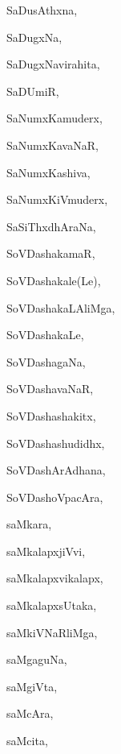 \begin{multicols}{3}
{\noindent
{SaDusAthxna}, \pageref{SaDusAthxna}

\noindent
{SaDugxNa}, \pageref{SaDugxNa}

\noindent
{SaDugxNavirahita}, \pageref{SaDugxNavirahita}

\noindent
{SaDUmiR}, \pageref{SaDUmiR}

\noindent
{SaNumxKamuderx}, \pageref{SaNumxKamuderx}

\noindent
{SaNumxKavaNaR}, \pageref{SaNumxKavaNaR}

\noindent
{SaNumxKashiva}, \pageref{SaNumxKashiva}

\noindent
{SaNumxKiVmuderx}, \pageref{SaNumxKiVmuderx}

\noindent
{SaSiThxdhAraNa}, \pageref{SaSiThxdhAraNa}

\noindent
{SoVDashakamaR}, \pageref{SoVDashakamaR}

\noindent
{SoVDashakale(Le)}, \pageref{SoVDashakaleLe}

\noindent
{SoVDashakaLAliMga}, \pageref{SoVDashakaLAliMga}

\noindent
{SoVDashakaLe}, \pageref{SoVDashakaLe}

\noindent
{SoVDashagaNa}, \pageref{SoVDashagaNa}

\noindent
{SoVDashavaNaR}, \pageref{SoVDashavaNaR}

\noindent
{SoVDashashakitx}, \pageref{SoVDashashakitx}

\noindent
{SoVDashashudidhx}, \pageref{SoVDashashudidhx}

\noindent
{SoVDashArAdhana}, \pageref{SoVDashArAdhana}

\noindent
{SoVDashoVpacAra}, \pageref{SoVDashoVpacAra}

\bigskip
\noindent
{}
\smallskip

\noindent
{saMkara}, \pageref{saMkara}

\noindent
{saMkalapxjiVvi}, \pageref{saMkalapxjiVvi}

\noindent
{saMkalapxvikalapx}, \pageref{saMkalapxvikalapx}

\noindent
{saMkalapxsUtaka}, \pageref{saMkalapxsUtaka}

\noindent
{saMkiVNaRliMga}, \pageref{saMkiVNaRliMga}

\noindent
{saMgaguNa}, \pageref{saMgaguNa}

\noindent
{saMgiVta}, \pageref{saMgiVta}

\noindent
{saMcAra}, \pageref{saMcAra}

\noindent
{saMcita}, \pageref{saMcita}

}
\end{multicols}
